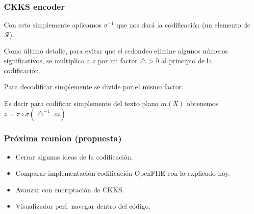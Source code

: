 \documentclass[10pt]{beamer}
\begin{document}
\begin{frame}
\frametitle{CKKS encoder}

Con esto simplemente aplicamos $\sigma^{-1}$ que nos dará la codificación
(un elemento de $\mathcal{R}$).

Como último detalle, para evitar que el redondeo elimine algunos números significativos,
se multiplica a $z$ por un factor $\bigtriangleup>0$ al principio de la codificación.

\pause
Para decodificar simplemente se divide por el mismo factor.


Es decir para codificar simplemente del texto plano $m(X)$ obtenemos
$z=\pi \circ \sigma(\bigtriangleup^{-1}.m)$

\end{frame}


\begin{frame}
\frametitle{Próxima reunion (propuesta)}

\begin{itemize}
  \item Cerrar algunas ideas de la codificación.
  \item Comparar implementación codificación OpenFHE con lo explicado hoy.
\pause
  \item Avanzar con encriptación de CKKS.
  \item Visualizador perf: navegar dentro del código.
\end{itemize}

\end{frame}
\end{document}
